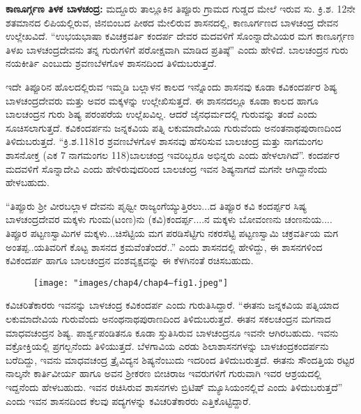 \textbf{ಕಾಣೂರ್ಗ್ಗಣ ತಿಳಕ ಬಾಳಚಂದ್ರ:} ಮದ್ದೂರು ತಾಲ್ಲೂಕಿನ ತಿಪ್ಪೂರು ಗ್ರಾಮದ ಗುಡ್ಡದ ಮೇಲೆ ಇರುವ ಸು. ಕ್ರಿ.ಶ. 12ನೇ ಶತಮಾನದ ಲಿಪಿಯಲ್ಲಿರುವ, ಜಿನಬಿಂಬದ ಪೀಠದ ಮೇಲಿರುವ ಶಾಸನದಲ್ಲಿ, ಕಾಣೂರ್ಗಣದ ಬಾಳಚಂದ್ರ ದೇವನ ಉಲ್ಲೇಖವಿದೆ. “ಉಭಯಭಾಷಾ ಕವಿಚಕ್ರವರ್ತಿ ಕಂದರ್ಪ ದೇವರ ಮದವಳಿಗೆ ಸೊಂನ್ನಾದೇವಿಯರ ಮಗ ಕಾಣೂರ್ಗ್ಗಣ ತಿಳಖ ಬಾಳಚಂದ್ರದೇವನು ತನ್ನ ಗುರುಗಳಿಗೆ ಪರೋಕ್ಷವಾಗಿ ಮಾಡಿದ ಪ್ರತಿಷ್ಠೆ” ಎಂದು ಹೇಳಿದೆ. ಬಾಲಚಂದ್ರನ ಗುರು ನಯಕೀರ್ತಿ ಎಂಬುದು ಶ್ರವಣಬೆಳಗೊಳ ಶಾಸನದಿಂದ ತಿಳಿದುಬರುತ್ತದೆ.

ಇದೇ ತಿಪ್ಪೂರಿನ ಹೊಲದಲ್ಲಿರುವ ಇಮ್ಮಡಿ ಬಲ್ಲಾಳನ ಕಾಲದ ಇನ್ನೊಂದು ಶಾಸನವು ಕೂಡಾ ಕವಿಕಂದರ್ಪರ ಶಿಷ್ಯ ಬಾಳಚಂದ್ರದೇವರು ಮತ್ತು ಅವರ ಮಕ್ಕಳನ್ನು ಉಲ್ಲೇಖಿಸುತ್ತದೆ. ಈ ಶಾಸನದಲ್ಲೂ ಕೂಡಾ ಕಾಲದ ಹಾಗೂ ಬಾಲಚಂದ್ರನ ಗುರು ಶಿಷ್ಯ ಪರಂಪರೆಯ ಉಲ್ಲೆಖವಿಲ್ಲ. ಆದರೆ ಜೈನಧರ್ಮದಲ್ಲಿ ಗುರುವನ್ನು ತಂದೆ ಎಂದು ಸೂಚಿಸಲಾಗುತ್ತದೆ. ಕವಿಕಂದರ್ಪನು ಜನ್ನಕವಿಯ ಪತ್ನಿ ಲಕುಮಾದೇವಿಯ ಗುರುವೆಂದು ಅನಂತನಾಥಪುರಾಣದಿಂದ ತಿಳಿದುಬರುತ್ತದೆ. “ಕ್ರಿ.ಶ.1181ರ ಶ್ರವಣಬೆಳಗೊಳ ಶಾಸನವು ಹೆಸರಿಸುವ ಬಾಲಚಂದ್ರ ಮತ್ತು ನಾಗಮಂಗಲ ಶಾಸನೋಕ್ತ (ಎಕ 7 ನಾಗಮಂಗಲ 118)ಬಾಲಚಂದ್ರ ಇವರಿಬ್ಬರೂ ಅಭಿನ್ನರು ಎಂದು ಹೇಳಲಾಗಿದೆ”. ಕಂದರ್ಪರ ಮದವಳಿಗೆ ಸೊನ್ನಾದೇವಿ ಎಂದು ಹೇಳಿರುವುದರಿಂದ ಬಾಲಚಂದ್ರ ಇವನ ಶಿಷ್ಯನಾಗದೆ ಮಗನೇ ಆಗಿದ್ದಾನೆಂದು ಹೇಳಬಹುದು.

“ತಿಪ್ಪೂರು ಶ‍್ರೀ ವೀರಬಲ್ಲಾಳ ದೇವನು ಪೃಥ್ವೀ ರಾಜ್ಯಂಗೆಯ್ಯುತ್ತಿರಲು...ದ ತಿಪ್ಪೂರ ಕವಿ ಕಂದರ್ಪ್ಪರ ಸಿಷ್ಯ ಬಾಳಚಂದ್ರದೇವರ ಮಕ್ಕಳು ಗುಂಮ(ಟಂಣ)ನು (ಕವಿ)ಕಂದರ್ಪ್ಪ....ನ ಮಕ್ಕಳು ಬೋವಂಣನು ಚಂಣನುಯ.... ತಿಪ್ಪೂರ ಪಟ್ಟಣಸ್ವಾಮಿಗಳ ಮಕ್ಕಳು...ಚಿಸೆಟ್ಟಿಯ ಮಗ ಪರಡಿಸೆಟ್ಟಿಗು ನಕರಸೆಟ್ಟಿ ಪಟ್ಟಣಸ್ವಾಮಿ ಚಕ್ರವರ್ತಿಯ ಮಗ ಅಂತಪ್ಪ..ಯತಿವರಿಗೆ ಕೊಟ್ಟ ಶಾಸನದ ಕ್ರಮವೆಂತೆಂದರೆ..” ಎಂದು ಶಾಸನದಲ್ಲಿ ಹೇಳಿದ್ದು, ಈ ಶಾಸನಗಳಿಂದ ಕವಿಕಂದರ್ಪ ಹಾಗೂ ಬಾಲಚಂದ್ರನ ವಂಶವೃಕ್ಷವನ್ನು ಈ ಕೆಳಗಿನಂತೆ ರಚಿಸಬಹುದು.

\begin{figure}[!h]
\texttt{[image: "images/chap4/chap4–fig1.jpeg"]}
\end{figure}

ಕವಿಚರಿತೆಕಾರರು ಇವನನ್ನು ಬಾಳಚಂದ್ರ ಕವಿಕಂದರ್ಪ ಎಂದು ಗುರುತಿಸಿದ್ದಾರೆ. “ಈತನು ಜನ್ನಕವಿಯ ಪತ್ನಿಯಾದ ಲಕುಮಾದೇವಿಯ ಗುರುವೆಂದು ಅನಂಥನಾಥಪುರಾಣದಿಂದ ತಿಳಿದುಬರುತ್ತದೆ. ಈತನ ಸಕಲಚಂದ್ರನ ಮಗನಾದ ಮಾಧವಚಂದ್ರನ ಶಿಷ್ಯ. ಪಾರ್ಶ್ವಪಂಡಿತನೂ ಕೂಡಾ ಸ್ತುತಿಸಿರುವ ಬಾಳಚಂದ್ರನೂ ಇವನೇ ಆಗಿರಬಹುದು. ಇವನು ವಕ್ರೋಕ್ತಿಯಲ್ಲಿ ಪ್ರಗಲ್ಬನೆಂದು ತಿಳಿಯುತ್ತದೆ. ಬೆಳಗಾವಿಯ ಎರಡು ಶಿಲಾಶಾಸನಗಳನ್ನು ಬಾಳಚಂದ್ರಕಂದರ್ಪನು ಬರೆದಿದ್ದು, ಇವನು ಮಾಧವಚಂದ್ರ ತ್ರೈವಿದ್ಯನ ಶಿಷ್ಯನೆಂಬುದು ಇದರಿಂದ ತಿಳಿದುಬರುತ್ತದೆ. ಈತನು ಸೌಂದತ್ತಿಯ ರಟ್ಟರ ನಾಲ್ಕನೇ ಕಾರ್ತಿವೀರ್ಯ ಹಾಗೂ ಅವನ ಶ‍್ರೀಕರಣ ಬೀಚಿರಾಜ ಇವರುಗಳಿಗೆ ಗುರುವಾಗಿ ಇವರ ಆಶ್ರಯದಲ್ಲಿ ಇದ್ದನೆಂದು ಹೇಳಬಹುದು. ಇವನ ರಚಿಸಿರುವ ಶಾಸನಗಳು ಬ್ರಿಟಿಷ್​ ಮ್ಯೂಸಿಯಂನಲ್ಲಿವೆ ಎಂದು ತಿಳಿದುಬರುತ್ತದೆ” ಎಂದು ಇವನ ಶಾಸನದಿಂದ ಕೆಲವು ಪದ್ಯಗಳನ್ನು ಕವಿಚರಿತೆಕಾರರು ಎತ್ತಿಕೊಟ್ಟಿದ್ದಾರೆ.


